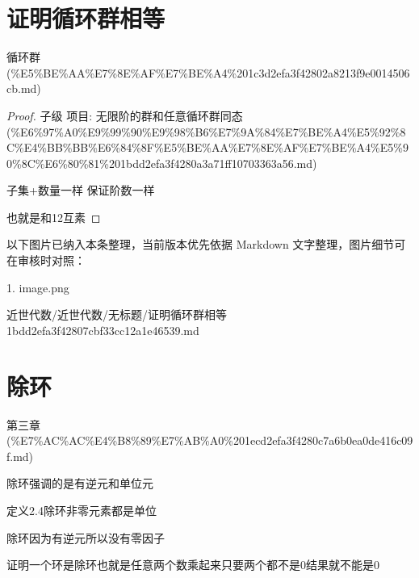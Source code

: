 \section*{证明循环群相等}

\begin{note}[来源上级主题]

循环群 (\%E5\%BE\%AA\%E7\%8E\%AF\%E7\%BE\%A4\%201c3d2efa3f42802a8213f9e0014506cb.md)

\end{note}

\begin{proof}

子级 项目: 无限阶的群和任意循环群同态 (\%E6\%97\%A0\%E9\%99\%90\%E9\%98\%B6\%E7\%9A\%84\%E7\%BE\%A4\%E5\%92\%8C\%E4\%BB\%BB\%E6\%84\%8F\%E5\%BE\%AA\%E7\%8E\%AF\%E7\%BE\%A4\%E5\%90\%8C\%E6\%80\%81\%201bdd2efa3f4280a3a71ff10703363a56.md)

子集+数量一样 保证阶数一样

也就是和12互素

\end{proof}

\begin{note}[关联图片]
以下图片已纳入本条整理，当前版本优先依据 Markdown 文字整理，图片细节可在审核时对照：

1. image.png\\

\end{note}

\begin{note}[来源路径]

近世代数/近世代数/无标题/证明循环群相等 1bdd2efa3f42807cbf33cc12a1e46539.md

\end{note}

\section*{除环}

\begin{note}[来源上级主题]

第三章 (\%E7\%AC\%AC\%E4\%B8\%89\%E7\%AB\%A0\%201ecd2efa3f4280c7a6b0ea0de416c09f.md)

\end{note}

\begin{note}[除环]

除环强调的是有逆元和单位元

定义2.4除环非零元素都是单位

除环因为有逆元所以没有零因子

证明一个环是除环也就是任意两个数乘起来只要两个都不是0结果就不能是0

\end{note}

